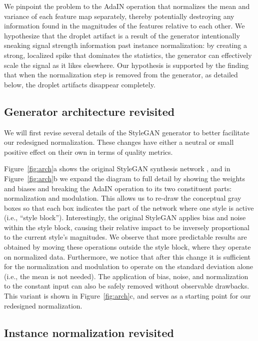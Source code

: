\documentclass[10pt,twocolumn,letterpaper]{article}
\begin{document}
We pinpoint the problem to the AdaIN operation that normalizes the mean and variance of each feature map separately, thereby potentially destroying any information found in the magnitudes of the features relative to each other.
We hypothesize that the droplet artifact is a result of the generator intentionally sneaking signal strength information past instance normalization:
by creating a strong, localized spike that dominates the statistics, the generator can effectively scale the signal as it likes elsewhere.
Our hypothesis is supported by the finding that when the normalization step is removed from the generator, as detailed below, the droplet artifacts disappear completely.

\subsection{Generator architecture revisited}

We will first revise several details of the StyleGAN generator to better facilitate our redesigned normalization. These changes have either a neutral or small positive effect on their own in terms of quality metrics.

Figure~\ref{fig:arch}a shows the original StyleGAN synthesis network  \cite{Karras2018}, and in Figure~\ref{fig:arch}b we expand the diagram to full detail by showing the weights and biases and breaking the AdaIN operation to its two constituent parts: normalization and modulation. This allows us to re-draw the conceptual gray boxes so that each box indicates the part of the network where one style is active (i.e., ``style block'').
Interestingly, the original StyleGAN applies bias and noise within the style block, causing their relative impact to be inversely proportional to the current style's magnitudes. We observe that more predictable results are obtained by moving these operations outside the style block, where they operate on normalized data. Furthermore, we notice that after this change it is sufficient for the normalization and modulation to operate on the standard deviation alone (i.e., the mean is not needed).
The application of bias, noise, and normalization to the constant input can also be safely removed without observable drawbacks. 
This variant is shown in Figure~\ref{fig:arch}c, and serves as a starting point for our redesigned normalization.

\subsection{Instance normalization revisited}
\end{document}

